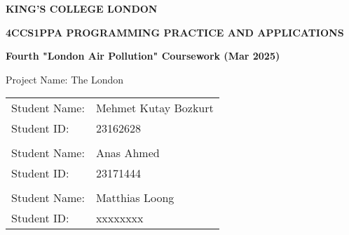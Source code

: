 \documentclass[10pt, a4paper]{scrartcl}
\begin{document}

    \begin{titlepage}
        \begin{center}
            \LARGE
            \textbf{KING'S COLLEGE LONDON}

            \vspace{2cm}

            \begin{adjustwidth}{-1cm}{-1cm}
                \centering
                \Large
                \textbf{4CCS1PPA PROGRAMMING PRACTICE AND APPLICATIONS}
            \end{adjustwidth}

            \vspace{0.5cm}

            \Large
            \textbf{Fourth "London Air Pollution" Coursework (Mar 2025)}

            \vspace{2cm}

            \Large
            Project Name: The London

            \vspace{1cm}

            \Large
            \begin{tabular}{l l}
                Student Name: & Mehmet Kutay Bozkurt \\
                Student ID: & 23162628 \\
                \vspace{0.5cm} & \\
                Student Name: & Anas Ahmed \\
                Student ID: & 23171444 \\
                \vspace{0.5cm} & \\
                Student Name: & Matthias Loong \\
                Student ID: & xxxxxxxx
            \end{tabular}
        \end{center}
    \end{titlepage}
\end{document}
